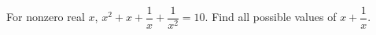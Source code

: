 For nonzero real $ x $, $ x^2+x+\dfrac{1}{x}+\dfrac{1}{x^2}=10 $. Find all possible values of $ x+\dfrac{1}{x}$.
